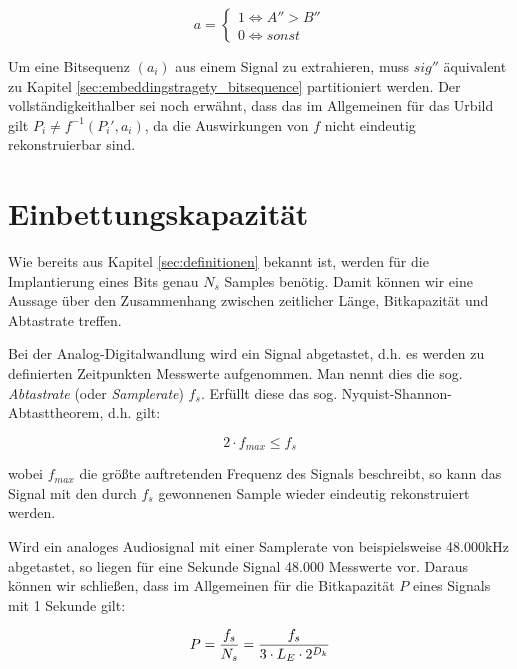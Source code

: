 	 \begin{equation}
		 a = \begin{cases}
    	 	1 \iff A'' > B''	 
			\\
    		0 \iff sonst
  		 \end{cases}
	 	\label{equ:extraction_bedingungen}
	 \end{equation}
	 
Um eine Bitsequenz $({a}_{i})$ aus einem Signal zu extrahieren, muss $sig''$ äquivalent zu Kapitel \ref{sec:embeddingstragety_bitsequence} partitioniert werden. Der vollständigkeithalber sei noch erwähnt, dass das im Allgemeinen für das Urbild gilt ${P}_{i} \neq f^{-1}({P}_{i}', {a}_{i})$, da die Auswirkungen von $f$ nicht eindeutig rekonstruierbar sind. 

\section{Einbettungskapazit\"at}

Wie bereits aus Kapitel \ref{sec:definitionen} bekannt ist, werden für die Implantierung eines Bits genau $N_s$ Samples benötig. Damit können wir eine Aussage über den Zusammenhang zwischen zeitlicher Länge, Bitkapazität und Abtastrate treffen. 

Bei der Analog-Digitalwandlung wird ein Signal abgetastet, d.h. es werden zu definierten Zeitpunkten Messwerte aufgenommen. Man nennt dies die sog. \textit{Abtastrate} (oder \textit{Samplerate}) $f_s$. Erfüllt diese das sog. Nyquist-Shannon-Abtasttheorem\cite{shannon1949communication}, d.h. gilt: 

	 \begin{equation}
		 2 \cdot f_{max} \leq f_s
	 	\label{equ:abtasttheorem}
	 \end{equation}
	
wobei ${f}_{max}$ die größte auftretenden Frequenz des Signals beschreibt, so kann das Signal mit den durch $f_s$ gewonnenen Sample wieder eindeutig rekonstruiert werden.

Wird ein analoges Audiosignal mit einer Samplerate von beispielsweise 48.000kHz abgetastet, so liegen für eine Sekunde Signal 48.000 Messwerte vor. Daraus können wir schließen, dass im Allgemeinen für die Bitkapazität $P$ eines Signals mit 1 Sekunde gilt: 

	 \begin{equation}
		 P = { {f}_{s} \over N_s } = { {f}_{s} \over 3 \cdot {L}_{E} \cdot 2 ^ {{D}_{k}} }
	 	\label{equ:bitcapacity_1sec}
	 \end{equation}

